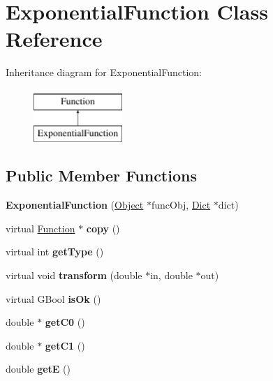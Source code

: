 \hypertarget{class_exponential_function}{}\section{Exponential\+Function Class Reference}
\label{class_exponential_function}
Inheritance diagram for Exponential\+Function\+:\begin{figure}[H]
\begin{center}
\leavevmode
\includegraphics[height=2.000000cm]{class_exponential_function}
\end{center}
\end{figure}
\subsection*{Public Member Functions}
\begin{DoxyCompactItemize}
\item 
\mbox{\label{class_exponential_function_a3333f38dfffbf2e957c0bc119ab397f6}} 
{\bfseries Exponential\+Function} (\hyperlink{class_object}{Object} $\ast$func\+Obj, \hyperlink{class_dict}{Dict} $\ast$dict)
\item 
\mbox{\label{class_exponential_function_a12927581fd8608e8c4668ad53e8c916b}} 
virtual \hyperlink{class_function}{Function} $\ast$ {\bfseries copy} ()
\item 
\mbox{\label{class_exponential_function_ac5ff5b3b414f322fd9a7fab56351ff74}} 
virtual int {\bfseries get\+Type} ()
\item 
\mbox{\label{class_exponential_function_ae01f065c0c1b1098f49ebe241f6aeaa1}} 
virtual void {\bfseries transform} (double $\ast$in, double $\ast$out)
\item 
\mbox{\label{class_exponential_function_ab311028fc126563b6c26bd61b6682c78}} 
virtual G\+Bool {\bfseries is\+Ok} ()
\item 
\mbox{\label{class_exponential_function_a8b38895dc574f810c25ee671e2643d34}} 
double $\ast$ {\bfseries get\+C0} ()
\item 
\mbox{\label{class_exponential_function_aa4cd0349d3aff0d1006bd0f6008853df}} 
double $\ast$ {\bfseries get\+C1} ()
\item 
\mbox{\label{class_exponential_function_afffa2b2034c71242a9a4cac54f0f704b}} 
double {\bfseries getE} ()
\end{DoxyCompactItemize}
